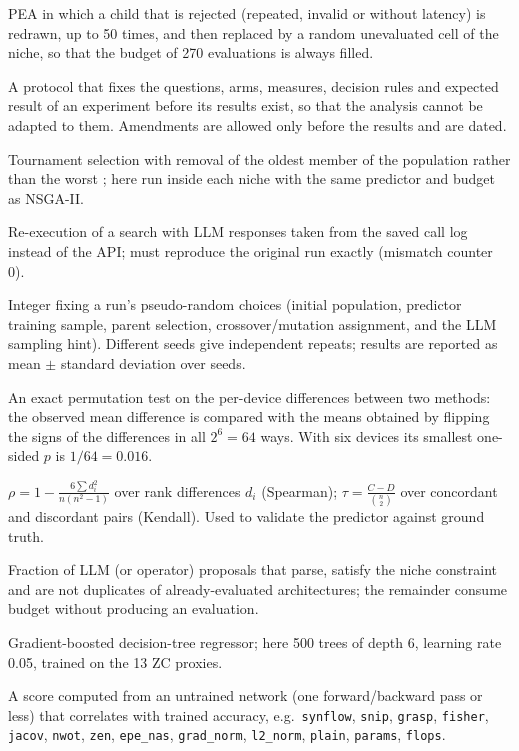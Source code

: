 \documentclass[preprint,12pt,authoryear]{elsarticle}
\newcommand{\code}[1]{\texttt{#1}}
\begin{document}
\begin{description}[style=nextline,leftmargin=0pt,itemsep=3pt]
\item[PEA with refilling.] PEA in which a child that is rejected (repeated, invalid or without latency) is redrawn, up to 50 times, and then replaced by a random unevaluated cell of the niche, so that the budget of 270 evaluations is always filled.

\item[Pre-registration.] A protocol that fixes the questions, arms, measures, decision rules and expected result of an experiment before its results exist, so that the analysis cannot be adapted to them. Amendments are allowed only before the results and are dated.

\item[Regularised (aging) evolution.] Tournament selection with removal of the oldest member of the population rather than the worst \cite{real19}; here run inside each niche with the same predictor and budget as NSGA-II.

\item[Replay.] Re-execution of a search with LLM responses taken from the saved call log instead of the API; must reproduce the original run exactly (mismatch counter 0).

\item[Seed.] Integer fixing a run's pseudo-random choices (initial population, predictor training sample, parent selection, crossover/mutation assignment, and the LLM sampling hint). Different seeds give independent repeats; results are reported as mean $\pm$ standard deviation over seeds.

\item[Sign-flip test.] An exact permutation test on the per-device differences between two methods: the observed mean difference is compared with the means obtained by flipping the signs of the differences in all $2^6=64$ ways. With six devices its smallest one-sided $p$ is $1/64=0.016$.

\item[Spearman / Kendall rank correlation.] $\rho=1-\frac{6\sum d_i^2}{n(n^2-1)}$ over rank differences $d_i$ (Spearman); $\tau=\frac{C-D}{\binom{n}{2}}$ over concordant and discordant pairs (Kendall). Used to validate the predictor against ground truth.

\item[Usable proposal rate.] Fraction of LLM (or operator) proposals that parse, satisfy the niche constraint and are not duplicates of already-evaluated architectures; the remainder consume budget without producing an evaluation.

\item[XGBoost.] Gradient-boosted decision-tree regressor; here 500 trees of depth 6, learning rate 0.05, trained on the 13 ZC proxies.

\item[Zero-cost (ZC) proxy.] A score computed from an untrained network (one forward/backward pass or less) that correlates with trained accuracy, e.g.\ \code{synflow}, \code{snip}, \code{grasp}, \code{fisher}, \code{jacov}, \code{nwot}, \code{zen}, \code{epe\_nas}, \code{grad\_norm}, \code{l2\_norm}, \code{plain}, \code{params}, \code{flops}.
\end{description}



\end{document}
